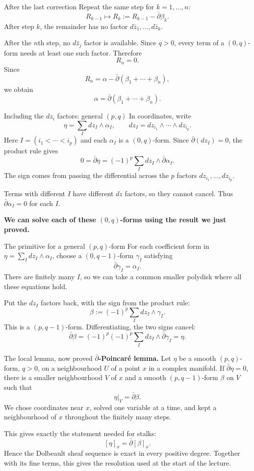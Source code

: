 \documentclass[aspectratio=169,11pt]{beamer}
\newcommand{\db}{\bar\partial}
\begin{document}
\begin{frame}{After the last correction}
Repeat the same step for $k=1,\ldots,n$:
\[
R_{k-1}\longmapsto
R_k:=R_{k-1}-\db\beta_k.
\]
After step $k$, the remainder has no factor
$d\bar z_1,\ldots,d\bar z_k$.

After the $n$th step, no $d\bar z_j$ factor is available.
Since $q>0$, every term of a $(0,q)$-form needs at least one such factor.
Therefore
\[
\boxed{R_n=0.}
\]
Since
\[
R_n
=\alpha-\db(\beta_1+\cdots+\beta_n),
\]
we obtain
\[
\boxed{\alpha=\db(\beta_1+\cdots+\beta_n).}
\]
\end{frame}

\begin{frame}{Including the $dz_i$ factors: general $(p,q)$}
In coordinates, write
\[
 \eta=\sum_I dz_I\wedge\alpha_I,
 \qquad dz_I=dz_{i_1}\wedge\cdots\wedge dz_{i_p}.
\]
Here $I=(i_1<\cdots<i_p)$ and each $\alpha_I$ is a $(0,q)$-form.
Since $\db(dz_I)=0$, the product rule gives
\[
 0=\db\eta=(-1)^p\sum_I dz_I\wedge\db\alpha_I.
\]
The sign comes from passing the differential across the $p$ factors
$dz_{i_1},\ldots,dz_{i_p}$.

Terms with different $I$ have different $dz$ factors, so they cannot
cancel. Thus $\db\alpha_I=0$ for each $I$.

\textbf{We can solve each of these $(0,q)$-forms using the result
we just proved.}
\end{frame}

\begin{frame}{The primitive for a general $(p,q)$-form}
For each coefficient form in $\eta=\sum_I dz_I\wedge\alpha_I$,
choose a $(0,q-1)$-form $\gamma_I$ satisfying
\[
 \db\gamma_I=\alpha_I.
\]
There are finitely many $I$, so we can take a common smaller polydisk
where all these equations hold.

Put the $dz_I$ factors back, with the sign from the product rule:
\[
 \beta:=(-1)^p\sum_I dz_I\wedge\gamma_I.
\]
This is a $(p,q-1)$-form. Differentiating, the two signs cancel:
\[
 \boxed{\db\beta=(-1)^p(-1)^p
       \sum_I dz_I\wedge\db\gamma_I=\eta.}
\]
\end{frame}

\begin{frame}{The local lemma, now proved}
\textbf{$\db$-Poincar\'e lemma.}
Let $\eta$ be a smooth $(p,q)$-form, $q>0$, on a neighbourhood
$U$ of a point $x$ in a complex manifold.
If $\db\eta=0$, there is a smaller neighbourhood $V$ of $x$ and a
smooth $(p,q-1)$-form $\beta$ on $V$ such that
\[
 \eta|_V=\db\beta.
\]
We chose coordinates near $x$, solved one variable at a time,
and kept a neighbourhood of $x$ throughout the finitely many steps.

This gives exactly the statement needed for stalks:
\[
 [\eta]_x=\db[\beta]_x.
\]
Hence the Dolbeault sheaf sequence is exact in every positive degree.
Together with its fine terms, this gives the resolution used at the
start of the lecture.
\end{frame}
\end{document}
